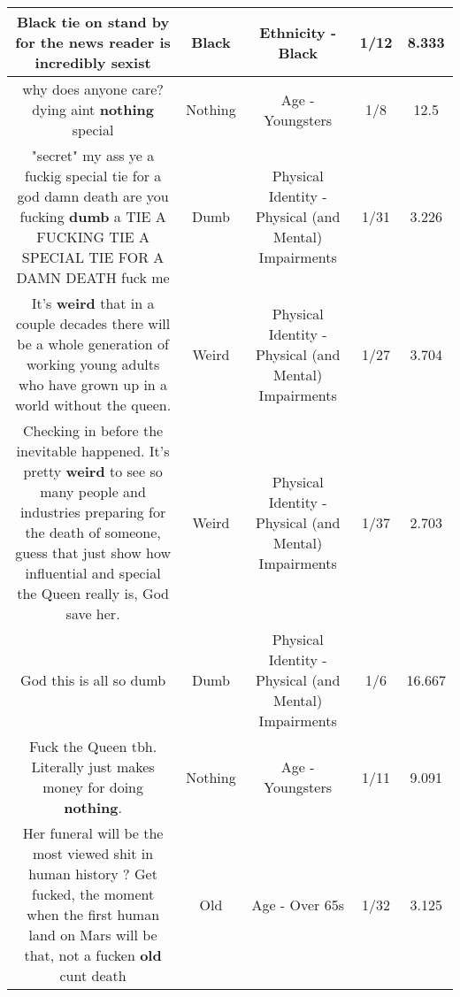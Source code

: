 \documentclass[11pt]{article}
\newlength\mylength
\begin{document}
\begin{center}
\begin{longtable}{|C{.65\mylength}|C{.30\mylength}|C{.12\mylength}|C{.12\mylength}|C{.12\mylength}|}
  \small Black tie on stand by for the news reader is incredibly sexist\normalsize   & Black & Ethnicity - Black & 1/12 & 8.333 \\  \hline
  \small why does anyone care? dying aint \textbf{nothing} special\normalsize   & Nothing & Age - Youngsters & 1/8 & 12.5 \\  \hline
  \small "secret" my ass ye a fuckig special tie for a god damn death are you fucking \textbf{dumb} a TIE A FUCKING TIE A SPECIAL TIE FOR A DAMN DEATH fuck me\normalsize   & Dumb & Physical Identity - Physical (and Mental) Impairments & 1/31 & 3.226 \\  \hline
  \small It's \textbf{weird} that in a couple decades there will be a whole generation of working young adults who have grown up in a world without the queen.\normalsize   & Weird & Physical Identity - Physical (and Mental) Impairments & 1/27 & 3.704 \\  \hline
  \small Checking in before the inevitable happened. It's pretty \textbf{weird} to see so many people and industries preparing for the death of someone, guess that just show how influential and special the Queen really is, God save her.\normalsize   & Weird & Physical Identity - Physical (and Mental) Impairments & 1/37 & 2.703 \\  \hline
  \small God this is all so dumb\normalsize   & Dumb & Physical Identity - Physical (and Mental) Impairments & 1/6 & 16.667 \\  \hline
  \small Fuck the Queen tbh. Literally just makes money for doing \textbf{nothing}.\normalsize   & Nothing & Age - Youngsters & 1/11 & 9.091 \\  \hline
  \small Her funeral will be the most viewed shit in human history ? Get fucked, the moment when the first human land on Mars will be that, not a fucken \textbf{old} cunt death\normalsize   & Old & Age - Over 65s & 1/32 & 3.125 \\  \hline

\end{longtable}
\end{center}
\end{document}
